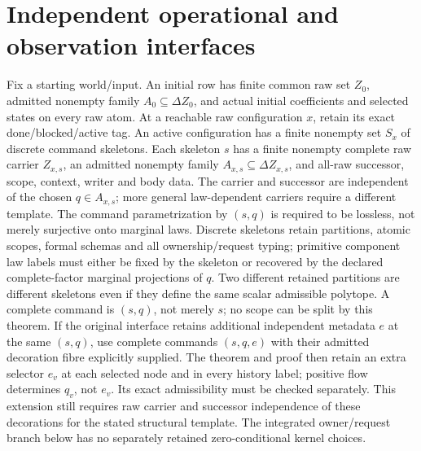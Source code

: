 \documentclass[11pt]{article}
\begin{document}
\section{Independent operational and observation interfaces}
Fix a starting world/input. An initial row has finite common raw set $Z_0$, admitted nonempty family $A_0\subseteq\Delta Z_0$, and actual initial coefficients and selected states on every raw atom. At a reachable raw configuration $x$, retain its exact done/blocked/active tag. An active configuration has a finite nonempty set $S_x$ of discrete command skeletons. Each skeleton $s$ has a finite nonempty complete raw carrier $Z_{x,s}$, an admitted nonempty family $A_{x,s}\subseteq\Delta Z_{x,s}$, and all-raw successor, scope, context, writer and body data. The carrier and successor are independent of the chosen $q\in A_{x,s}$; more general law-dependent carriers require a different template. The command parametrization by $(s,q)$ is required to be lossless, not merely surjective onto marginal laws. Discrete skeletons retain partitions, atomic scopes, formal schemas and all ownership/request typing; primitive component law labels must either be fixed by the skeleton or recovered by the declared complete-factor marginal projections of $q$. Two different retained partitions are different skeletons even if they define the same scalar admissible polytope. A complete command is $(s,q)$, not merely $s$; no scope can be split by this theorem. If the original interface retains additional independent metadata $e$ at the same $(s,q)$, use complete commands $(s,q,e)$ with their admitted decoration fibre explicitly supplied. The theorem and proof then retain an extra selector $e_v$ at each selected node and in every history label; positive flow determines $q_v$, not $e_v$. Its exact admissibility must be checked separately. This extension still requires raw carrier and successor independence of these decorations for the stated structural template. The integrated owner/request branch below has no separately retained zero-conditional kernel choices.
\end{document}
